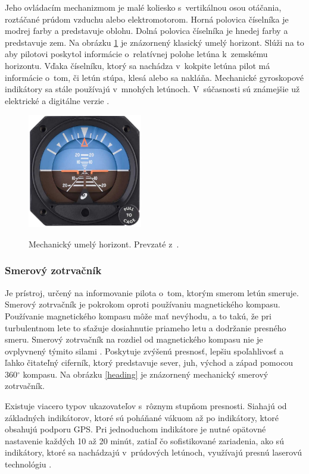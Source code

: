 Jeho ovládacím mechanizmom je malé koliesko s~vertikálnou osou otáčania, roztáčané prúdom vzduchu alebo elektromotorom. Horná polovica číselníka je modrej farby a predstavuje oblohu. Dolná polovica číselníka je hnedej farby a predstavuje zem. Na obrázku \ref{poloha} je znázornený klasický umelý horizont. Slúži na to aby pilotovi poskytol informácie o~relatívnej polohe letúna k~zemskému horizontu. Vďaka číselníku, ktorý sa nachádza v~kokpite letúna pilot má informácie o~tom, či letún stúpa, klesá alebo sa nakláňa. Mechanické gyroskopové indikátory sa stále používajú v~mnohých letúnoch. V~súčasnosti sú známejšie už elektrické a digitálne verzie \cite{gyroscope}.


\begin{figure}[ht]
\centering
\includegraphics[height=5cm, width=5cm]{obrazky-figures/umelyhorizont.png}
\caption{Mechanický umelý horizont. Prevzaté z~\cite{fotoIndikator}.}{\label{poloha}}
\end{figure}

\bigskip
\subsubsection{Smerový zotrvačník}
Je prístroj, určený na informovanie pilota o~tom, ktorým smerom letún smeruje. Smerový zotrvačník je pokrokom oproti používaniu magnetického kompasu. Používanie magnetického kompasu môže mať nevýhodu, a to takú, že pri turbulentnom lete to sťažuje dosiahnutie priameho letu a dodržanie presného smeru. Smerový zotrvačník na rozdiel od magnetického kompasu nie je ovplyvnený týmito silami \cite{gyroscopeHeading}. Poskytuje zvýšenú presnosť, lepšiu spoľahlivosť a ľahko čitateľný ciferník, ktorý predstavuje sever, juh, východ a západ pomocou 360$^\circ$ kompasu. Na obrázku \ref{heading} je znázornený mechanický smerový zotrvačník.

Existuje viacero typov ukazovateľov s~rôznym stupňom presnosti. Siahajú od základných indikátorov, ktoré sú poháňané vákuom až po indikátory, ktoré obsahujú podporu GPS. Pri jednoduchom indikátore je nutné opätovné nastavenie každých 10 až 20 minút, zatiaľ čo sofistikované zariadenia, ako sú indikátory, ktoré sa nachádzajú v~prúdových letúnoch, využívajú presnú laserovú technológiu \cite{heading}.

